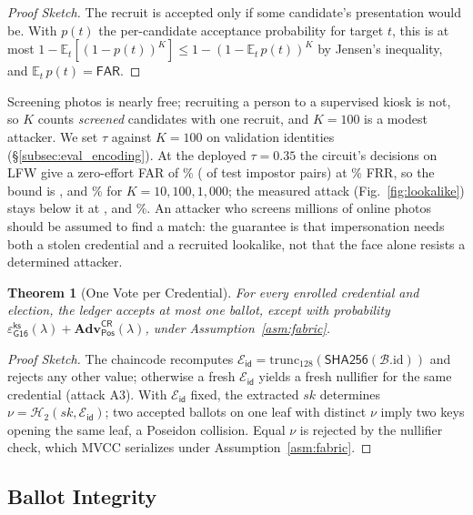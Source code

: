 \documentclass[10pt,letterpaper,journal]{IEEEtran}
\newtheorem{theorem}{Theorem}[section]
\begin{document}
\begin{proof}[Proof Sketch]
The recruit is accepted only if some candidate's presentation would be. With $p(t)$ the per-candidate acceptance probability for target $t$, this is at most $1 - \mathbb{E}_t[(1-p(t))^K] \le 1 - (1 - \mathbb{E}_t\,p(t))^K$ by Jensen's inequality, and $\mathbb{E}_t\,p(t) = \mathsf{FAR}$.
\end{proof}

Screening photos is nearly free; recruiting a person to a supervised kiosk is not, so $K$ counts \emph{screened} candidates with one recruit, and $K = 100$ is a modest attacker. We set $\tau$ against $K = 100$ on validation identities (\S\ref{subsec:eval_encoding}). At the deployed $\tau = 0.35$ the circuit's decisions on LFW give a zero-effort FAR of \nFar\% (\nFalseAccepts{} of \nImpostorPairs{} test impostor pairs) at \nFrr\% FRR, so the bound is \nLookBoundTen, \nLookBoundHundred{} and \nLookBoundThousand\% for $K = 10, 100, 1{,}000$; the measured attack (Fig.~\ref{fig:lookalike}) stays below it at \nLookLfwTen, \nLookLfwHundred{} and \nLookLfwThousand\%. An attacker who screens millions of online photos should be assumed to find a match: the guarantee is that impersonation needs both a stolen credential and a recruited lookalike, not that the face alone resists a determined attacker.

\begin{theorem}[One Vote per Credential]
\label{thm:antireplay}
For every enrolled credential and election, the ledger accepts at most one ballot, except with probability $\varepsilon^{\mathsf{ks}}_{\mathsf{G16}}(\lambda) + \mathbf{Adv}^{\mathsf{CR}}_{\mathsf{Pos}}(\lambda)$, under Assumption~\ref{asm:fabric}.
\end{theorem}

\begin{proof}[Proof Sketch]
The chaincode recomputes $\mathcal{E}_{\mathsf{id}} = \mathrm{trunc}_{128}(\mathsf{SHA256}(\mathcal{B}.\mathrm{id}))$ and rejects any other value; otherwise a fresh $\mathcal{E}_{\mathsf{id}}$ yields a fresh nullifier for the same credential (attack A3). With $\mathcal{E}_{\mathsf{id}}$ fixed, the extracted $sk$ determines $\nu = \mathcal{H}_2(sk, \mathcal{E}_{\mathsf{id}})$; two accepted ballots on one leaf with distinct $\nu$ imply two keys opening the same leaf, a Poseidon collision. Equal $\nu$ is rejected by the nullifier check, which MVCC serializes under Assumption~\ref{asm:fabric}.
\end{proof}

\subsection{Ballot Integrity}
\label{sec:integrity}
\end{document}
